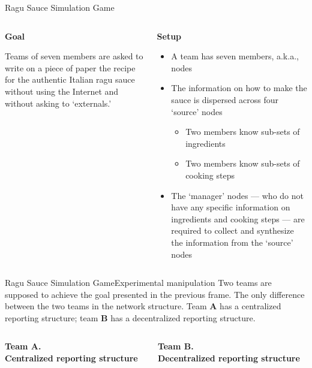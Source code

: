 \documentclass[show notes, aspectratio=1610]{beamer}
\begin{document}
\begin{frame}{Ragu Sauce Simulation Game}{}
	\small
	\begin{columns}[t]
		\begin{column}{0.4\textwidth}
			\begin{center}
			\textbf{Goal}
		        \end{center}
			Teams of seven members are asked to write on a piece of 
			paper the recipe for the authentic Italian ragu sauce
			without using the Internet and without asking
			to `externals.'
		\end{column}
		\begin{column}{0.6\textwidth}
			\begin{center}
			\textbf{Setup}
			\end{center}
			\begin{itemize}
				\item A team has seven members, a.k.a., nodes
				\item The information on how to make the sauce is
				dispersed across four `source' nodes 
				\begin{itemize}
					\item Two members know sub-sets of ingredients 
					\item Two members know sub-sets of cooking steps
				\end{itemize}
				\item The `manager' nodes --- who do not have 
				any specific information on ingredients and 
				cooking steps --- are required to collect 
				and synthesize the information from the `source' 
				nodes
			\end{itemize}
		\end{column}
	\end{columns}
\end{frame}

\begin{frame}{Ragu Sauce Simulation Game}{Experimental manipulation}
	Two teams are supposed to achieve the goal presented in the previous 
	frame. The only difference between the two teams in the network
	structure. Team \textbf{A} has a centralized reporting structure;
	team \textbf{B} has a decentralized reporting structure.
	\vspace{-1em}
	\begin{columns}[t]
		\begin{column}{0.5\textwidth}
			\begin{center}
			\textbf{Team A.\\Centralized reporting structure}

			

			\end{center}
		\end{column}
		\begin{column}{0.5\textwidth}
			\begin{center}
			\textbf{Team B.\\Decentralized reporting structure}
			
			
			\end{center}
		\end{column}
	\end{columns}
\end{frame}
\end{document}
